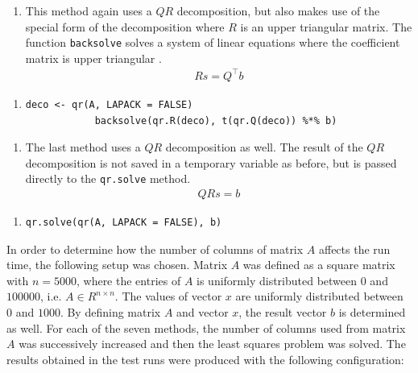 \begin{enumerate}[resume*=quest]
	\item This method again uses a $QR$ decomposition, but also makes use of the special form of the decomposition where $R$ is an upper triangular matrix. The function \texttt{backsolve} solves a system of linear equations where the coefficient matrix is upper triangular \cite{R}.
	\begin{align*}
		Rs = Q^\top b
	\end{align*}
\end{enumerate}
\begin{enumerate}[resume*=inform]
	\item[] \begin{lstlisting}[otherkeywords={\%*\%, qr.R}, numbers=none]
			deco <- qr(A, LAPACK = FALSE)
			backsolve(qr.R(deco), t(qr.Q(deco)) %*% b)
			\end{lstlisting}
\end{enumerate}


\begin{enumerate}[resume*=quest]
	\item The last method uses a $QR$ decomposition as well. The result of the $QR$ decomposition is not saved in a temporary variable as before, but is passed directly to the \texttt{qr.solve} method. 	
	\begin{align*}
		QRs = b
	\end{align*}
\end{enumerate}
\begin{enumerate}[resume*=inform]
	\item[] \begin{lstlisting}[otherkeywords={\%*\%, qr.R}, numbers=none]
			qr.solve(qr(A, LAPACK = FALSE), b)
			\end{lstlisting}
\end{enumerate}

In order to determine how the number of columns of matrix $A$ affects the run time, the following setup was chosen. Matrix $A$ was defined as a square matrix with $n = 5000$, where the entries of $A$ is uniformly distributed between $0$ and $100000$, i.e. $A \in R^{n \times n}$. The values of vector $x$ are uniformly distributed between $0$ and $1000$. By defining matrix $A$ and vector $x$, the result vector $b$ is determined as well. For each of the seven methods, the number of columns used from matrix $A$ was successively increased and then the least squares problem was solved. The results obtained in the test runs were produced with the following configuration: 

